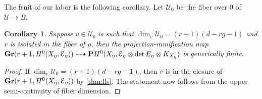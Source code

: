 \documentclass[11pt,reqno]{amsart}
\theoremstyle{plain}
\newtheorem{corollary}[theorem]{Corollary}
\theoremstyle{definition}
\theoremstyle{remark}
\numberwithin{equation}{section}
\renewcommand{\to}{{\longrightarrow}}
\numberwithin{equation}{section}
\begin{document}
The fruit of our labor is the following corollary.
Let $\mathcal U_0$ be the fiber over $0$ of $\mathcal U \to B$.
\begin{corollary}\label{prop:degeneration}
  Suppose $v \in \mathcal U_0$ is such that $\dim_v \mathcal U_0 = (r+1)(d-rg-1)$ and $v$ is isolated in the fiber of $\rho$, then the projection-ramification map ${\bf Gr}(r+1, H^0(X_\eta, \mathcal E_\eta)) \dashrightarrow {\bf P} H^0(X_\eta, \mathcal E_\eta \otimes \det E_\eta \otimes K_{X_\eta})$ is generically finite.
\end{corollary}
\begin{proof}
  If $\dim_v \mathcal U_0 = (r+1)(d-rg-1)$, then $v$ is in the closure of ${\bf Gr}(r+1, H^0(X_\eta, \mathcal E_\eta))$ by \autoref{thm:lls}.
  The statement now follows from the upper semi-continuity of fiber dimension.
\end{proof}
\end{document}
